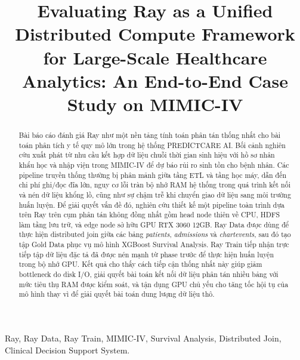\documentclass[conference]{IEEEtran}
\begin{document}
\title{Evaluating Ray as a Unified Distributed Compute Framework for Large-Scale Healthcare Analytics: An End-to-End Case Study on MIMIC-IV}

\author{
}

\maketitle

\begin{abstract}
Bài báo cáo đánh giá Ray như một nền tảng tính toán phân tán thống nhất cho bài toán phân tích y tế quy mô lớn trong hệ thống PREDICTCARE AI. Bối cảnh nghiên cứu xuất phát từ nhu cầu kết hợp dữ liệu chuỗi thời gian sinh hiệu với hồ sơ nhân khẩu học và nhập viện trong MIMIC-IV để dự báo rủi ro sinh tồn cho bệnh nhân. Các pipeline truyền thống thường bị phân mảnh giữa tầng ETL và tầng học máy, dẫn đến chi phí ghi/đọc đĩa lớn, nguy cơ lỗi tràn bộ nhớ RAM hệ thống trong quá trình kết nối và nén dữ liệu khổng lồ, cũng như sự chậm trễ khi chuyển giao dữ liệu sang môi trường huấn luyện. Để giải quyết vấn đề đó, nghiên cứu thiết kế một pipeline toàn trình dựa trên Ray trên cụm phân tán không đồng nhất gồm head node thiên về CPU, HDFS làm tầng lưu trữ, và edge node sở hữu GPU RTX 3060 12GB. Ray Data được dùng để thực hiện distributed join giữa các bảng \textit{patients}, \textit{admissions} và \textit{chartevents}, sau đó tạo tập Gold Data phục vụ mô hình XGBoost Survival Analysis. Ray Train tiếp nhận trực tiếp tập dữ liệu đặc tả đã được nén mạnh từ phase trước để thực hiện huấn luyện trong bộ nhớ GPU. Kết quả cho thấy cách tiếp cận thống nhất này giúp giảm bottleneck do disk I/O, giải quyết bài toán kết nối dữ liệu phân tán nhiều bảng với mức tiêu thụ RAM được kiểm soát, và tận dụng GPU chủ yếu cho tăng tốc hội tụ của mô hình thay vì để giải quyết bài toán dung lượng dữ liệu thô.
\end{abstract}

\begin{IEEEkeywords}
Ray, Ray Data, Ray Train, MIMIC-IV, Survival Analysis, Distributed Join, Clinical Decision Support System.
\end{IEEEkeywords}









\end{document}
